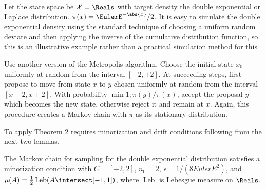 \documentclass[12pt]{article}
\begin{document}
\begin{example}

    Let the state space be \( \mathcal{X} = \Reals \) with target
    density the double exponential or Laplace distribution. \( \pi(x) =
    \EulerE^{-\abs{x}}/2 \).  It is easy to simulate the double
    exponential density using the standard technique of choosing a
    uniform random deviate and then applying the inverse of the
    cumulative distribution function, so this is an illustrative example
    rather than a practical simulation method for this

    Use another version of the Metropolis algorithm.  Choose the initial
    state \( x_0 \) uniformly at random from the interval \( [ -2, +2] \).
    At succeeding steps, first propose to move from state \( x \) to \(
    y \) chosen uniformly at random from the interval \( [x - 2, x + 2] \).
    With probability \( \min{1, \pi(y)/\pi(x)} \), accept the proposal \(
    y \) which becomes the new state, otherwise reject it and remain at \(
    x \).  Again, this procedure creates a Markov chain with \( \pi \)
    as its stationary distribution.

    To apply Theorem 2 requires minorization and drift conditions
    following from the next two lemmas.

    \begin{lemma}
        The Markov chain for sampling for the double exponential
        distribution satisfies a minorization condition with \( C = [-2,
        2] \), \( n_0 = 2 \), \( \epsilon = 1/(8 EulerE^2) \), and \(
        \mu(A) = \frac{1}{2}
        \operatorname{Leb}
        (A \intersect [-1,1]) \), where \(
        \operatorname{Leb}
        \) is Lebesgue measure on \( \Reals \).
    \end{lemma}


\end{example}
\end{document}
